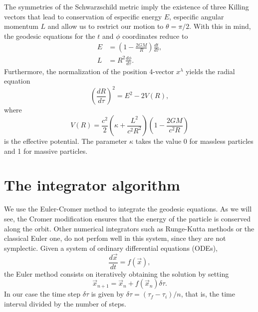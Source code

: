 \documentclass[journal, a4paper]{IEEEtran}
\begin{document}
The symmetries of the Schwarzschild metric imply the existence of three Killing vectors that lead to conservation of especific energy $E$, especific angular momentum $L$ and allow us to restrict our motion to $\theta = \pi/2$. With this in mind, the geodesic equations for the $t$ and $ \phi $ coordinates reduce to
\begin{equation}
	\begin{split}
		E & = \left( 1 - \frac{2GM}{R} \right) \frac{dt}{d \tau}, \\
		L & = R^2 \frac{d \phi}{d \tau}.
	\end{split}
\end{equation}
Furthermore, the normalization of the position 4-vector $x^\lambda$ yields the radial equation 
\begin{equation}\label{radial_equation}
	\left( \frac{dR}{d \tau} \right)^2 = E^2 - 2 V(R),
\end{equation}
where
\begin{equation}
	V(R) = \frac{c^2}{2} \left( \kappa + \frac{ L^2}{ c^2 R^2} \right) \left( 1 - \frac{2GM}{c^2 R} \right) 
\end{equation}
is the effective potential. The parameter \(\kappa\) takes the value 0 for massless particles and 1 for massive particles.
\section{The integrator algorithm}
We use the Euler-Cromer method to integrate the geodesic equations. As we will see, the Cromer modification ensures that the energy of the particle is conserved along the orbit. Other numerical integrators such as Runge-Kutta methods or the classical Euler one, do not perfom well in this system, since they are not symplectic.
Given a system of ordinary differential equations (ODEs),
\begin{equation}
	\frac{d \vec{x}}{dt} = f( \vec{x} ),
\end{equation}
the Euler method consists on iteratively obtaining the solution by setting
\begin{equation}
	\vec{x}_{n+1} = \vec{x}_{n} + f( \vec{x}_{n} ) \delta \tau.
\end{equation}
In our case the time step $ \delta \tau $ is given by $ \delta \tau = ( \tau _f - \tau _i) / n$, that is, the time interval divided by the number of steps.
\end{document}

